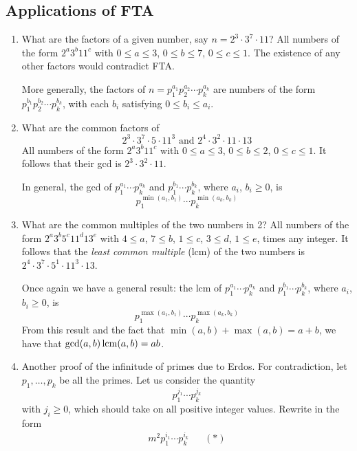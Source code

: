 \documentclass{../template/note}
\begin{document}
    \subsection{Applications of FTA}

    \begin{enumerate}[label=\protect\circled{\arabic*}]
        \item What are the factors of a given number, say \(n = 2^3 \cdot 3^7 \cdot 11\)? All numbers of the form \(2^a 3^b 11^c\) with \(0 \leq a \leq 3\), \(0 \leq b \leq 7\), \(0 \leq c \leq 1\). The existence of any other factors would contradict FTA.
        
        More generally, the factors of \(n = p_1^{a_1}p_2^{a_2}\cdots p_k^{a_k}\) are numbers of the form \(p_1^{b_1}p_2^{b_2}\cdots p_k^{b_k}\), with each \(b_i\) satisfying \(0 \leq b_i \leq a_i\).

        \item What are the common factors of
        \[
            2^3 \cdot 3^7 \cdot 5 \cdot 11^3 \text{ and } 2^4 \cdot 3^2 \cdot 11 \cdot 13
        \]
        All numbers of the form \(2^a 3^b 11^c\) with \(0 \leq a \leq 3\), \(0 \leq b \leq 2\), \(0 \leq c \leq 1\). It follows that their gcd is \(2^3 \cdot 3^2 \cdot 11\).

        In general, the gcd of \(p_1^{a_1}\cdots p_k^{a_k}\) and \(p_1^{b_1} \cdots p_k^{b_k}\), where \(a_i\), \(b_i \geq 0\), is
        \[
            p_1^{\min(a_1,b_1)} \cdots p_k^{\min(a_k, b_k)}
        \]

        \item What are the common multiples of the two numbers in 2? All numbers of the form \(2^a 3^b 5^c 11^d 13^e\) with \(4 \leq a\), \(7 \leq b\), \(1 \leq c\), \(3 \leq d\), \(1 \leq e\), times any integer. It follows that the \emph{least common multiple} (lcm) of the two numbers is \(2^4 \cdot 3^7 \cdot 5^1 \cdot 11^3 \cdot 13\).
        
        Once again we have a general result: the lcm of \(p_1^{a_1}\cdots p_k^{a_k}\) and \(p_1^{b_1} \cdots p_k^{b_k}\), where \(a_i\), \(b_i \geq 0\), is
        \[
            p_1^{\max(a_1,b_1)} \cdots p_k^{\max(a_k, b_k)}
        \]
        From this result and the fact that \(\min(a, b) + \max(a, b) = a + b\), we have that \(\gcd(a,b)\operatorname*{lcm}(a,b) = ab\).

        \item Another proof of the infinitude of primes due to Erdos. For contradiction, let \(p_1, \dots, p_k\) be all the primes. Let us consider the quantity
        \[ 
            p_1^{j_1} \cdots p_k^{j_k}
        \]
        with \(j_i \geq 0\), which should take on all positive integer values. Rewrite in the form
        \begin{align*}
            m^2 p_1^{i_1} \cdots p_k^{i_k} && (*)       
        \end{align*}
        

\end{enumerate}
\end{document}
